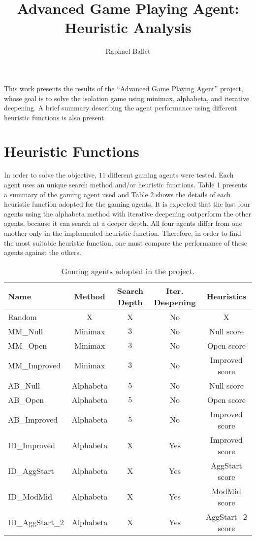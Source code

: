 \documentclass[12pt, a4paper]{article}
\title{Advanced Game Playing Agent: \\Heuristic Analysis}
\author{Raphael Ballet}
\date{}
\begin{document}
	\maketitle
	
	This work presents the results of the ``Advanced Game Playing Agent'' project, whose goal is to solve the isolation game using minimax, alphabeta, and iterative deepening. A brief summary describing the agent performance using different heuristic functions is also present.

\section{Heuristic Functions}	
	In order to solve the objective, $11$ different gaming agents were tested. Each agent uses an unique search method and/or heuristic functions. Table 1 presents a summary of the gaming agent used and Table 2 shows the details of each heuristic function adopted for the gaming agents. It is expected that the last four agents using the alphabeta method with iterative deepening outperform the other agents, because it can search at a deeper depth. All four agents differ from one another only in the implemented heuristic function. Therefore, in order to find the most suitable heuristic function, one must compare the performance of these agents against the others.
	
	\begin{table}[!h]
		\centering
		\caption{Gaming agents adopted in the project.}	
		\begin{tabular}{lcccc}
			Name & Method & Search Depth & Iter. Deepening & Heuristics \\
			\hline
			Random & X & X & No & X \\
			MM{\_}Null & Minimax & $3$ & No & Null score \\
			MM{\_}Open & Minimax & $3$ & No & Open score \\
			MM{\_}Improved & Minimax & $3$ & No & Improved score \\
			AB{\_}Null & Alphabeta & $5$ & No & Null score \\
			AB{\_}Open & Alphabeta & $5$ & No & Open score \\
			AB{\_}Improved & Alphabeta & $5$ & No & Improved score \\
			ID{\_}Improved & Alphabeta & X & Yes & Improved score \\
			ID{\_}AggStart & Alphabeta & X & Yes & AggStart score \\
			ID{\_}ModMid & Alphabeta & X & Yes & ModMid score \\
			ID{\_}AggStart\_2 & Alphabeta & X & Yes & AggStart\_2 score \\
			\hline
		\end{tabular}
	\end{table}
	
\end{document}
